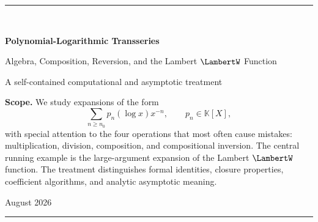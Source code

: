 \documentclass[11pt,oneside]{article}
\numberwithin{equation}{section}
\theoremstyle{definition}
\newcommand{\K}{\mathbb{K}}
\begin{document}
\hypersetup{pageanchor=false}

\begin{titlepage}
\centering
\vspace*{2.5cm}
{\color{accent}\rule{0.86\textwidth}{1.2pt}}\\[1.2cm]
{\Huge\bfseries\color{ink} Polynomial-Logarithmic Transseries\par}
\vspace{0.45cm}
{\LARGE Algebra, Composition, Reversion, and the Lambert \(\LambertW\) Function\par}
\vspace{1.2cm}
{\large A self-contained computational and asymptotic treatment\par}
\vfill
\begin{minipage}{0.82\textwidth}
\small
\textbf{Scope.}  We study expansions of the form
\[
  \sum_{n\ge n_0} p_n(\log x)x^{-n},\qquad p_n\in\K[X],
\]
with special attention to the four operations that most often cause mistakes:
multiplication, division, composition, and compositional inversion.  The central
running example is the large-argument expansion of the Lambert \(\LambertW\) function.
The treatment distinguishes formal identities, closure properties, coefficient
algorithms, and analytic asymptotic meaning.
\end{minipage}
\vfill
{\large August 2026\par}
{\color{accent}\rule{0.86\textwidth}{1.2pt}}
\end{titlepage}
\hypersetup{pageanchor=true}
\setcounter{page}{1}
\end{document}
